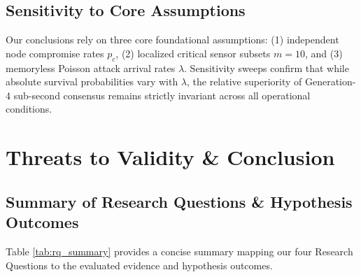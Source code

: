 \documentclass[10pt,twocolumn,journal]{IEEEtran}
\begin{document}
\subsection{Sensitivity to Core Assumptions}
Our conclusions rely on three core foundational assumptions: (1) independent node compromise rates $p_c$, (2) localized critical sensor subsets $m=10$, and (3) memoryless Poisson attack arrival rates $\lambda$. Sensitivity sweeps confirm that while absolute survival probabilities vary with $\lambda$, the relative superiority of Generation-4 sub-second consensus remains strictly invariant across all operational conditions.

\section{Threats to Validity & Conclusion}
\label{sec:conclusion}

\subsection{Summary of Research Questions & Hypothesis Outcomes}
Table \ref{tab:rq_summary} provides a concise summary mapping our four Research Questions to the evaluated evidence and hypothesis outcomes.

\begin{table}[htbp]
\caption{Summary of Research Questions, Evaluated Evidence, and Hypothesis Outcomes}
\label{tab:rq_summary}
\centering
\scriptsize
{}
\end{table}
\end{document}

